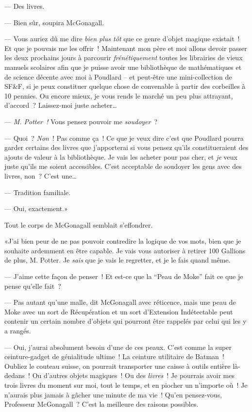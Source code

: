 --- Des livres.

--- Bien sûr, soupira McGonagall.

--- Vous auriez dû me dire \emph{bien plus tôt} que ce genre d'objet magique existait~! Et que je pouvais me les offrir~! Maintenant mon père et moi allons devoir passer les deux prochains jours à parcourir \emph{frénétiquement} toutes les librairies de vieux manuels scolaires afin que je puisse avoir une bibliothèque de mathématiques et de science décente avec moi à Poudlard -- et peut-être une mini-collection de SF\&F, si je peux constituer quelque chose de convenable à partir des corbeilles à 10 pennies. Ou encore mieux, je vous rends le marché un peu plus attrayant, d'accord~? Laissez-moi juste acheter…

--- \emph{M. Potter~!} Vous pensez pouvoir me \emph{soudoyer}~?

--- Quoi~? \emph{Non}~! Pas comme ça~! Ce que je veux dire c'est que Poudlard pourra garder certains des livres que j'apporterai si vous pensez qu'ils constitueraient des ajouts de valeur à la bibliothèque. Je vais les acheter pour pas cher, et \emph{je} veux juste qu'ils me soient accessibles. C'est acceptable de soudoyer les gens avec des livres, non~? C'est une…

--- Tradition familiale.

--- Oui, exactement.»

Tout le corps de McGonagall semblait s'effondrer.

«J'ai bien peur de ne pas pouvoir contredire la logique de vos mots, bien que je souhaite ardemment en être capable. Je vais vous autoriser à retirer 100 Gallions de plus, M. Potter. Je \emph{sais} que je vais le regretter, et je le fais quand même.

--- J'aime cette façon de penser~! Et est-ce que la “Peau de Moke” fait ce que je pense qu'elle fait~?

--- Pas autant qu'une malle, dit McGonagall avec réticence, mais une peau de Moke avec un sort de Récupération et un sort d'Extension Indétectable peut contenir un certain nombre d'objets qui pourront être rappelés par celui qui les y a rangés.

--- Oui, j'aurai absolument besoin d'une de ces peaux. C'est comme la super ceinture-gadget de génialitude ultime~! La ceinture utilitaire de Batman~! Oubliez le couteau suisse, on pourrait transporter une caisse à outils entière là-dedans~! Ou d'autres objets magiques~! Ou des \emph{livres}~! Je pourrais avoir mes trois livres du moment sur moi, tout le temps, et en piocher un n'importe où~! Je n'aurais plus jamais à gâcher une minute de ma vie~! Qu'en pensez-vous, Professeur McGonagall~? C'est la meilleure des raisons possibles.

